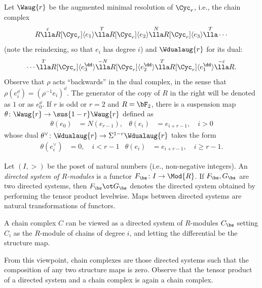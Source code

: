 Let $\Waug{r}$ be the augmented minimal resolution of $\Cyc_r$, i.e., the chain complex
\[
R
\overset{\varepsilon}{\lla} 
R[\Cyc_r]\langle e_{1}\rangle
\overset{T}{\lla}
R[\Cyc_r]\langle e_{2}\rangle
\overset{N}{\lla}
R[\Cyc_r]\langle e_{3}\rangle
\overset{T}{\lla}
\dotsb
\]
(note the reindexing, so that $e_i$ has degree $i$) and $\Wdualaug{r}$ for its dual:
\[
\dotsb
\overset{T}{\lla}
R[\Cyc_r]\langle e_{3}^\dd\rangle
\overset{-N}{\lla}
R[\Cyc_r]\langle e_{2}^\dd\rangle
\overset{T}{\lla}
R[\Cyc_r]\langle e_{1}^\dd\rangle
\overset{-\varepsilon}{\lla} 
R.
\]
Observe that $\rho$ acts ``backwards'' in the dual complex, in the sense that $\rho (e_{i}^\dd) = (\rho^{-1} e_i)^{\dd}$. %
The generator of the copy of $R$ in the right will be denoted as $1$ or as $e_0^\dd$.
If $r$ is odd or $r=2$ and $R=\bF_2$, there is a suspension map $\theta \colon \Waug{r} \to \sus{1-r}\Waug{r}$ defined as %
\begin{align*}
	\theta(e_0) &= N(e_{r-1}),
	&
	\theta(e_{i}) &= e_{i+r-1}, \quad i>0 
\end{align*}
whose dual $\theta^\vee\colon \Wdualaug{r}\to \Sigma^{1-r}\Wdualaug{r}$ takes the form
\begin{align*}
	\theta(e_{i}^{\vee}) &= 0, \quad i < r-1
	&
	\theta(e_{i}) &= e_{i+r-1}, \quad i\geq r-1.
\end{align*}

Let $(I,>)$ be the poset of natural numbers (i.e., non-negative integers). An \emph{directed system of $R$-modules} is a functor $F_\bs\colon I\to \Mod{R}$. If $F_\bs,G_{\bs}$ are two directed systems, then $F_\bs\ot G_{\bs}$ denotes the directed system obtained by performing the tensor product levelwise. Maps between directed systems are natural transformations of functors. 

A chain complex $C$ can be viewed as a directed system of $R$-modules $C_{\bs}$ setting $C_i$ as the $R$-module of chains of degree $i$, and letting the differential be the structure map. 

From this viewpoint, chain complexes are those directed systems such that the composition of any two structure maps is zero. Observe that the tensor product of a directed system and a chain complex is again a chain complex.

